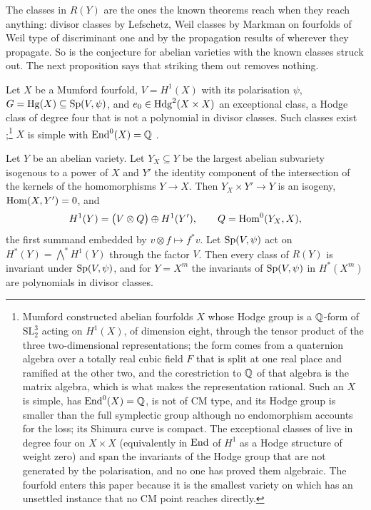 The classes in $R(Y)$ are the ones the known theorems reach when they reach anything: divisor classes by Lefschetz, Weil classes by Markman \cite{Mar23} on fourfolds of Weil type of discriminant one and by the propagation results of \cite{BMB26} wherever they propagate. So \Fii{} is the conjecture for abelian varieties with the known classes struck out. The next proposition says that striking them out removes nothing.

\begin{setup}\label{setup:mumford}
Let $X$ be a Mumford fourfold, $V=H^{1}(X)$ with its polarisation $\psi$, $G=\mathrm{Hg}(X)\subseteq\mathrm{Sp}(V,\psi)$, and $e_{0}\in\mathrm{Hdg}^{2}(X\times X)$ an exceptional class, a Hodge class of degree four that is not a polynomial in divisor classes. Such classes exist \cite{MZ95};\footnote{Mumford constructed \cite{Mum69} abelian fourfolds $X$ whose Hodge group is a $\mathbb{Q}$-form of $\mathrm{SL}_{2}^{3}$ acting on $H^{1}(X)$, of dimension eight, through the tensor product of the three two-dimensional representations; the form comes from a quaternion algebra over a totally real cubic field $F$ that is split at one real place and ramified at the other two, and the corestriction to $\mathbb{Q}$ of that algebra is the matrix algebra, which is what makes the representation rational. Such an $X$ is simple, has $\mathrm{End}^{0}(X)=\mathbb{Q}$, is not of CM type, and its Hodge group is smaller than the full symplectic group although no endomorphism accounts for the loss; its Shimura curve is compact. The exceptional classes of \cite{MZ95} live in degree four on $X\times X$ (equivalently in $\mathrm{End}$ of $H^{1}$ as a Hodge structure of weight zero) and span the invariants of the Hodge group that are not generated by the polarisation, and no one has proved them algebraic. The fourfold enters this paper because it is the smallest variety on which \Fii{} has an unsettled instance that no CM point reaches directly.} $X$ is simple with $\mathrm{End}^{0}(X)=\mathbb{Q}$ \cite{Mum69}.
\end{setup}

\begin{lemma}\label{lem:sp-invariance}
Let $Y$ be an abelian variety. Let $Y_{X}\subseteq Y$ be the largest abelian subvariety isogenous to a power of $X$ and $Y'$ the identity component of the intersection of the kernels of the homomorphisms $Y\to X$. Then $Y_{X}\times Y'\to Y$ is an isogeny, $\mathrm{Hom}(X,Y')=0$, and
\[
H^{1}(Y)=\bigl(V\otimes Q\bigr)\oplus H^{1}(Y'),\qquad Q=\mathrm{Hom}^{0}(Y_{X},X),
\]
the first summand embedded by $v\otimes f\mapsto f^{*}v$. Let $\mathrm{Sp}(V,\psi)$ act on $H^{*}(Y)=\bigwedge^{*}H^{1}(Y)$ through the factor $V$. Then every class of $R(Y)$ is invariant under $\mathrm{Sp}(V,\psi)$, and for $Y=X^{m}$ the invariants of $\mathrm{Sp}(V,\psi)$ in $H^{*}(X^{m})$ are polynomials in divisor classes.
\end{lemma}

